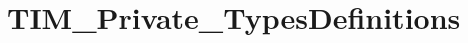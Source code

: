 \hypertarget{group___t_i_m___private___types_definitions}{\section{T\-I\-M\-\_\-\-Private\-\_\-\-Types\-Definitions}
\label{group___t_i_m___private___types_definitions}
}
